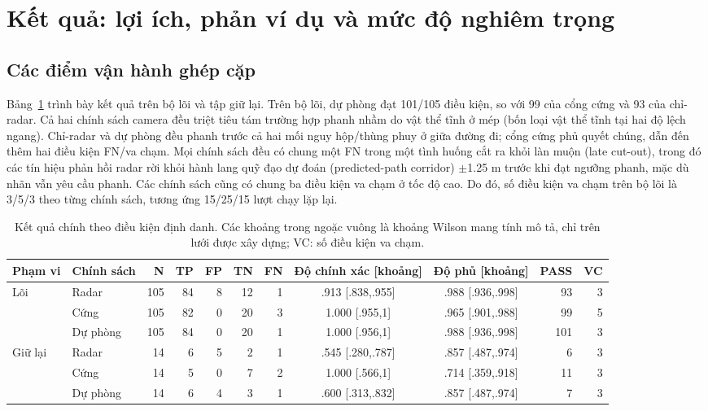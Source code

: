 \documentclass[conference]{IEEEtran}
\begin{document}
\section{Kết quả: lợi ích, phản ví dụ và mức độ nghiêm trọng}
\subsection{Các điểm vận hành ghép cặp}
Bảng~\ref{tab:primary} trình bày kết quả trên bộ lõi và tập giữ lại. Trên bộ
lõi, dự phòng đạt 101/105 điều kiện, so với 99 của cổng cứng và 93 của
chỉ-radar. Cả hai chính sách camera đều triệt tiêu tám trường hợp phanh nhầm
do vật thể tĩnh ở mép (bốn loại vật thể tĩnh tại hai độ lệch ngang). Chỉ-radar
và dự phòng đều phanh trước cả hai mối nguy hộp/thùng phuy ở giữa đường đi;
cổng cứng phủ quyết chúng, dẫn đến thêm hai điều kiện FN/va chạm. Mọi chính
sách đều có chung một FN trong một tình huống cắt ra khỏi làn muộn (late
cut-out), trong đó các tín hiệu phản hồi radar rời khỏi hành lang quỹ đạo dự
đoán (predicted-path corridor) $\pm$1.25 m trước khi đạt ngưỡng phanh, mặc dù
nhãn vẫn yêu cầu phanh. Các chính sách cũng có chung ba điều kiện va chạm ở tốc
độ cao. Do
đó, số điều kiện va chạm trên bộ lõi là 3/5/3 theo từng chính sách, tương ứng
15/25/15 lượt chạy lặp lại.

\begin{table}[t]
\caption{Kết quả chính theo điều kiện định danh. Các khoảng trong ngoặc vuông
là khoảng Wilson mang tính mô tả, chỉ trên lưới được xây dựng; VC: số điều
kiện va chạm.}
\label{tab:primary}
\centering\scriptsize
\setlength{\tabcolsep}{3pt}
\begin{tabular}{llrrrrrccrr}
\toprule Phạm vi & Chính sách & N & TP & FP & TN & FN & Độ chính xác [khoảng] & Độ phủ [khoảng] & PASS & VC\\
\midrule
Lõi & Radar & 105 & 84 & 8 & 12 & 1 & .913 [.838,.955] & .988 [.936,.998] & 93 & 3\\
 & Cứng & 105 & 82 & 0 & 20 & 3 & 1.000 [.955,1] & .965 [.901,.988] & 99 & 5\\
 & Dự phòng & 105 & 84 & 0 & 20 & 1 & 1.000 [.956,1] & .988 [.936,.998] & 101 & 3\\
\midrule
Giữ lại & Radar & 14 & 6 & 5 & 2 & 1 & .545 [.280,.787] & .857 [.487,.974] & 6 & 3\\
 & Cứng & 14 & 5 & 0 & 7 & 2 & 1.000 [.566,1] & .714 [.359,.918] & 11 & 3\\
 & Dự phòng & 14 & 6 & 4 & 3 & 1 & .600 [.313,.832] & .857 [.487,.974] & 7 & 3\\
\bottomrule
\end{tabular}
\end{table}
\end{document}

